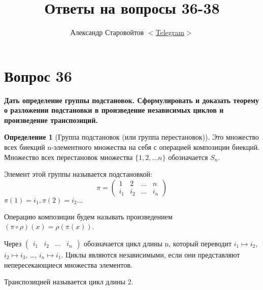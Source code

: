 \documentclass[a4paper]{article}
\author{Александр Старовойтов %
$<$\href{https://t.me/stewkk}%
{Telegram}$>$}
\title{Ответы на вопросы 36-38}
\theoremstyle{definition}
\newtheorem{definition}{Определение}
\theoremstyle{plain}
\begin{document}
\maketitle
\section{Вопрос 36}
\textbf{Дать определение группы подстановок.
Сформулировать и доказать теорему о разложении подстановки в произведение независимых циклов и произведение транспозиций.}

\begin{definition}[Группа подстановок (или группа перестановок)]
  Это множество всех биекций n-элементного множества на себя с операцией композиции биекций.
  Множество всех перестановок множества $\{1, 2, \ldots{} n\}$ обозначается $S_{n}$.
\end{definition}
Элемент этой группы называется подстановкой:
\begin{equation*}
  \pi =
  \begin{pmatrix}
    1 & 2 & \ldots & n\\
    i_{1} & i_{2} & \ldots & i_{n}
  \end{pmatrix}
\end{equation*}
$\pi(1) = i_{1}, \pi(2) = i_{2} \ldots$

Операцию композиции будем называть произведением $(\pi\circ\rho)(x) = \rho(\pi(x))$.

Через $\begin{pmatrix}i_{1}&i_{2}&\ldots&i_{n}\end{pmatrix}$ обозначается цикл длины n, который переводит $i_{1} \mapsto i_{2}$, $i_{2} \mapsto i_{3}$, \ldots, $i_{n} \mapsto i_{1}$.
Циклы являются независимыми, если они представляют непересекающиеся множества элементов.

Транспозицией называется цикл длины 2.
\end{document}
